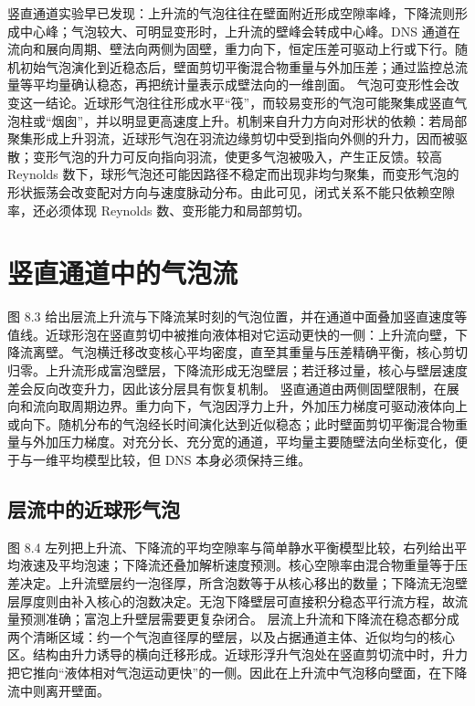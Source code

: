 \documentclass[11pt,a4paper,openany,fontset=none]{ctexbook}
\begin{document}
竖直通道实验早已发现：上升流的气泡往往在壁面附近形成空隙率峰，下降流则形成中心峰；气泡较大、可明显变形时，上升流的壁峰会转成中心峰。DNS 通道在流向和展向周期、壁法向两侧为固壁，重力向下，恒定压差可驱动上行或下行。随机初始气泡演化到近稳态后，壁面剪切平衡混合物重量与外加压差；通过监控总流量等平均量确认稳态，再把统计量表示成壁法向的一维剖面。
气泡可变形性会改变这一结论。近球形气泡往往形成水平“筏”，而较易变形的气泡可能聚集成竖直气泡柱或“烟囱”，并以明显更高速度上升。机制来自升力方向对形状的依赖：若局部聚集形成上升羽流，近球形气泡在羽流边缘剪切中受到指向外侧的升力，因而被驱散；变形气泡的升力可反向指向羽流，使更多气泡被吸入，产生正反馈。较高 Reynolds 数下，球形气泡还可能因路径不稳定而出现非均匀聚集，而变形气泡的形状振荡会改变配对方向与速度脉动分布。由此可见，闭式关系不能只依赖空隙率，还必须体现 Reynolds 数、变形能力和局部剪切。

\section{竖直通道中的气泡流}

图 8.3 给出层流上升流与下降流某时刻的气泡位置，并在通道中面叠加竖直速度等值线。近球形泡在竖直剪切中被推向液体相对它运动更快的一侧：上升流向壁，下降流离壁。气泡横迁移改变核心平均密度，直至其重量与压差精确平衡，核心剪切归零。上升流形成富泡壁层，下降流形成无泡壁层；若迁移过量，核心与壁层速度差会反向改变升力，因此该分层具有恢复机制。
竖直通道由两侧固壁限制，在展向和流向取周期边界。重力向下，气泡因浮力上升，外加压力梯度可驱动液体向上或向下。随机分布的气泡经长时间演化达到近似稳态；此时壁面剪切平衡混合物重量与外加压力梯度。对充分长、充分宽的通道，平均量主要随壁法向坐标变化，便于与一维平均模型比较，但 DNS 本身必须保持三维。

\subsection{层流中的近球形气泡}

图 8.4 左列把上升流、下降流的平均空隙率与简单静水平衡模型比较，右列给出平均液速及平均泡速；下降流还叠加解析速度预测。核心空隙率由混合物重量等于压差决定。上升流壁层约一泡径厚，所含泡数等于从核心移出的数量；下降流无泡壁层厚度则由补入核心的泡数决定。无泡下降壁层可直接积分稳态平行流方程，故流量预测准确；富泡上升壁层需要更复杂闭合。
层流上升流和下降流在稳态都分成两个清晰区域：约一个气泡直径厚的壁层，以及占据通道主体、近似均匀的核心区。结构由升力诱导的横向迁移形成。近球形浮升气泡处在竖直剪切流中时，升力把它推向“液体相对气泡运动更快”的一侧。因此在上升流中气泡移向壁面，在下降流中则离开壁面。
\end{document}
